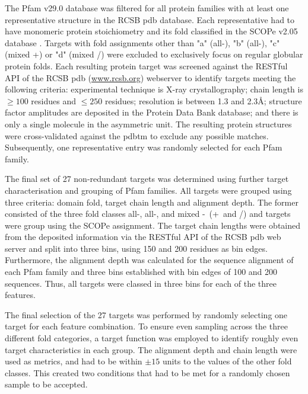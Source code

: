 The Pfam v29.0 \cite{Finn2016-tz} database was filtered for all protein families with at least one representative structure in the RCSB \gls{pdb} \cite{Berman2000-qj} database. Each representative had to have monomeric protein stoichiometry and its fold classified in the SCOPe v2.05 database \cite{Chandonia2017-bd}. Targets with fold assignments other than "a" (all-\textalpha), "b" (all-\textbeta), "c" (mixed \textalpha+\textbeta) or "d" (mixed \textalpha/\textbeta) were excluded to exclusively focus on regular globular protein folds. Each resulting protein target was screened against the RESTful API of the RCSB \gls{pdb} (\url{www.rcsb.org}) webserver to identify targets meeting the following criteria: experimental technique is X-ray crystallography; chain length is $\geq100$ residues and $\leq250$ residues; resolution is between 1.3 and 2.3\AA; structure factor amplitudes are deposited in the Protein Data Bank \cite{Berman2000-qj} database; and there is only a single molecule in the asymmetric unit. The resulting protein structures were cross-validated against the \gls{pdbtm} \cite{Tusnady2005-lp} to exclude any possible matches. Subsequently, one representative entry was randomly selected for each Pfam family.

The final set of 27 non-redundant targets was determined using further target characterisation and grouping of Pfam families. All targets were grouped using three criteria: domain fold, target chain length and alignment depth. The former consisted of the three fold classes all-\textalpha, all-\textbeta, and mixed \textalpha-\textbeta\ (\textalpha+\textbeta\ and \textalpha/\textbeta) and targets were group using the SCOPe assignment. The target chain lengths were obtained from the deposited information via the RESTful API of the RCSB \gls{pdb} web server and split into three bins, using 150 and 200 residues as bin edges. Furthermore, the alignment depth was calculated for the sequence alignment of each Pfam family and three bins established with bin edges of 100 and 200 sequences. Thus, all targets were classed in three bins for each of the three features. 

The final selection of the 27 targets was performed by randomly selecting one target for each feature combination. To ensure even sampling across the three different fold categories, a target function was employed to identify roughly even target characteristics in each group. The alignment depth and chain length were used as metrics, and had to be within $\pm15$ units to the values of the other fold classes. This created two conditions that had to be met for a randomly chosen sample to be accepted.

